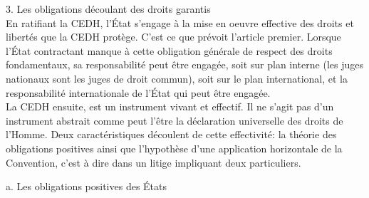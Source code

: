\documentclass[10pt, a4paper, openany]{book}
\begin{document}
3. Les obligations découlant des droits garantis \\
En ratifiant la CEDH, l'État s'engage à la mise en oeuvre effective des droits et libertés que la CEDH protège. C'est ce que prévoit l'article premier. Lorsque l'État contractant manque à cette obligation générale de respect des droits fondamentaux, sa responsabilité peut être engagée, soit sur plan interne (les juges nationaux sont les juges de droit commun), soit sur le plan international, et la responsabilité internationale de l'État qui peut être engagée. \\
La CEDH ensuite, est un instrument vivant et effectif. Il ne s'agit pas d'un instrument abstrait comme peut l'être la déclaration universelle des droits de l'Homme. Deux caractéristiques découlent de cette effectivité: la théorie des obligations positives ainsi que l'hypothèse d'une application horizontale de la Convention, c'est à dire dans un litige impliquant deux particuliers. 


a. Les obligations positives des États
\end{document}
